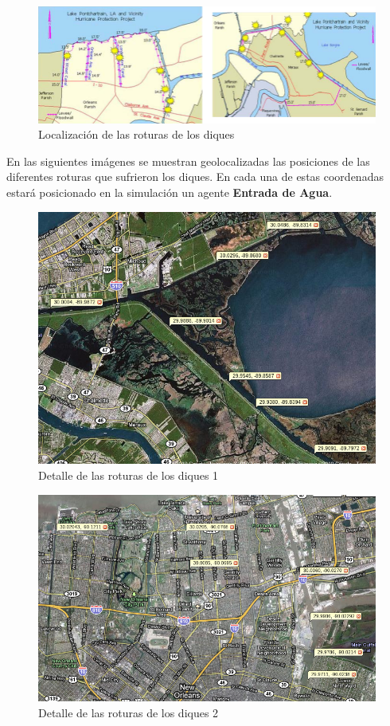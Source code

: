 \begin{figure}[H]
 \centering
 \includegraphics[width=135mm]{figuras/cap6/dikes.png}
 \caption{Localización de las roturas de los diques}
\end{figure}

En las siguientes imágenes se muestran geolocalizadas las posiciones de las
diferentes roturas que sufrieron los diques. En cada una de estas coordenadas
estará posicionado en la simulación un agente {\bf Entrada de Agua}.

\begin{figure}[H]
 \centering
 \includegraphics[width=135mm]{figuras/cap6/dikes1.png}
 \caption{Detalle de las roturas de los diques 1}
\end{figure}

\begin{figure}[H]
 \centering
 \includegraphics[width=135mm]{figuras/cap6/dikes2.png}
 \caption{Detalle de las roturas de los diques 2}
\end{figure}


